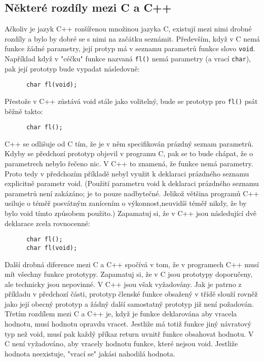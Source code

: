     \subsection{Některé rozdíly mezi C a C++}
      Ačkoliv je jazyk C++ rozšířenou množinou jazyka C, existují mezi nimi drobné rozdíly a bylo 
      by dobré se s nimi na začátku seznámit. Především, když v C nemá funkce žádné parametry, její 
      protyp má v seznamu parametrů funkce slovo \lstinline[basicstyle=\ttfamily]!void!. Například 
      když v "céčku" funkce nazvaná \lstinline[basicstyle=\ttfamily]!fl()! nemá parametry (a vrací 
      \lstinline[basicstyle=\ttfamily]!char!), pak její prototyp bude vypadat následovně:
      \begin{lstlisting}
      char fl(void);
      \end{lstlisting}
      Přestože v C++ zůstává void stále jako volitelný, bude se prototyp pro 
      \lstinline[basicstyle=\ttfamily]!fl()! psát běžně takto:
      \begin{lstlisting}
      char fl();
      \end{lstlisting}
  
      C++ se odlišuje od C tím, že je v něm specifikován prázdný seznam parametrů. Kdyby se 
      předchozí prototyp objevil v programu C, pak se to bude chápat, že o parametrech nebylo 
      řečeno nic. V C++ to znamená, že funkce nemá parametry. Proto tedy v předchozím příkladě 
      nebyl využit k deklaraci prázdného seznamu explicitně parametr void. (Použití parametru void 
      k deklaraci prázdného  seznamu parametrů není zakázáno; je to pouze nadbytečné. Jelikož 
      většina programů C++ usiluje o téměř posvátným zanícením o výkonnost,neuvidíš téměř nikdy, že 
      by bylo void tímto způsobem použito.) Zapamatuj si, že v C++ jsou následující dvě deklarace 
      zcela rovnocenné:
      \begin{lstlisting}
      char fl();
      char fl(void);
      \end{lstlisting}
  
      Další drobná diference mezi C a C++ spočívá v tom, že v programech C++ musí mít všechny 
      funkce prototypy. Zapamatuj si, že v C jsou prototypy doporučeny, ale technicky jsou 
      nepovinné. V C++ jsou však vyžadovány. Jak je patrno z příkladu v předchozí části, prototyp 
      členské funkce obsažený v třídě slouží rovněž jako její obecný prototyp a žádný další 
      samostatný prototyp již není požadován. Třetím rozdílem mezi C a C++ je, když je funkce 
      deklarována aby vracela hodnotu, musí hodnotu opravdu vracet. Jestliže má totiž funkce jiný 
      návratový typ než void, musí pak každý příkaz return uvnitř funkce obsahovat hodnotu. V C 
      není vyžadováno, aby vracely hodnotu funkce, které nejsou void. Jestliže hodnota neexistuje, 
      "vrací se" jakási nahodilá hodnota.
   
